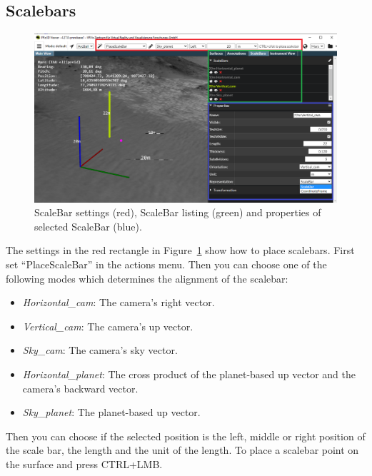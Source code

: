 \newpage
\subsection{Scalebars}
\label{sec:scalebars}

\begin{figure}[h]
    	\centering
    		\includegraphics[width=1\textwidth]{pics/scaleBars.png}
    	\caption[Viewer Features ScaleBars]{ScaleBar settings (red), ScaleBar listing (green) and properties of selected ScaleBar (blue).}
    	\label{fig:scaleBars}
   \end{figure}
	
The settings in the red rectangle in Figure~\ref{fig:scaleBars} show how to place scalebars. First set ``PlaceScaleBar'' in the actions menu. Then you can choose one of the following modes which determines the alignment of the scalebar:
\begin{itemize}
	\item \textit{Horizontal\_cam}: The camera's right vector.
	\item \textit{Vertical\_cam}: The camera's up vector.
	\item \textit{Sky\_cam}: The camera's sky vector.
	\item \textit{Horizontal\_planet}: The cross product of the planet-based up vector and the camera's backward vector.
	\item \textit{Sky\_planet}: The planet-based up vector.
	\label{tab:scaleBarsOrientations}
\end{itemize}

Then you can choose if the selected position is the left, middle or right position of the scale bar, the length and the unit of the length. To place a scalebar point on the surface and press CTRL+LMB.
	
